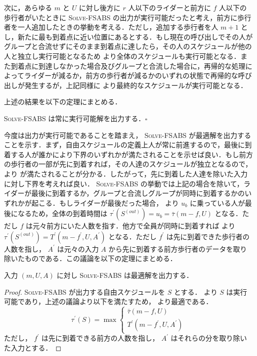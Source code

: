 次に，あらゆる $m$ と $U$ に対し後方に $r$ 人以下のライダーと前方に $f$ 人以下の歩行者がいたときに \textsc{Solve-FSABS} の出力が実行可能だったと考え，前方に歩行者を一人追加したときの挙動を考える．ただし，追加する歩行者を人 $m + 1$ とし，新たに最も到着点に近い位置にあるとする．もし現在の呼び出しでその人がグループと合流せずにそのまま到着点に達したら，その人のスケジュールが他の人と独立し実行可能となるため  より全体のスケジュールも実行可能となる．また到着点に到達しなかった場合及びグループと合流した場合に，再帰的な処理によってライダーが減るか，前方の歩行者が減るかのいずれの状態で再帰的な呼び出しが発生するが，上記同様に  より最終的なスケジュールが実行可能となる．

上述の結果を以下の定理にまとめる．

\begin{theorem}\label{theorem:solve-fsabs-is-feasible}
  \textsc{Solve-FSABS} は常に実行可能解を出力する．\hfill $\square$
\end{theorem}


今度は出力が実行可能であることを踏まえ， \textsc{Solve-FSABS} が最適解を出力することを示す．まず，自由スケジュールの定義上人が常に前進するので，最後に到着する人が誰かにより下界のいずれかが満たされることを示せば良い．もし前方の歩行者の一部が先に到着すれば，その人達のスケジュールが独立となるので，  より  が満たされることが分かる．したがって，先に到着した人達を除いた入力に対し下界を考えれば良い． \textsc{Solve-FSABS} の挙動では上記の場合を除いて，ライダーが最後に到着するか，グループと合流しグループが同時に到着するかのいずれかが起こる．もしライダーが最後だった場合，  より $u_b$ に乗っている人が最後になるため，全体の到着時間は $\tau^\prime(S^{(out)}) = u_b = \bar\tau(m - f, U)$ となる．ただし $f$ は元々前方にいた人数を指す．他方で全員が同時に到着すれば  より $\tau^\prime(S^{(out)}) = T^\prime(m - f^\prime, U, A^\prime)$ となる．ただし $f^\prime$ は先に到着できた歩行者の人数を指し， $A^{\prime}$ は元々の入力 $A$ から先に到着する前方歩行者のデータを取り除いたものである．この議論を以下の定理にまとめる．

\begin{theorem}
  入力 $(m, U, A)$ に対し \textsc{Solve-FSABS} は最適解を出力する．
\end{theorem}
\begin{proof}
  \textsc{Solve-FSABS} が出力する自由スケジュールを $S$ とする．  より $S$ は実行可能であり，上述の議論より以下を満たすため，  より最適である．
  \begin{equation}
    \tau^\prime(S) = \max \begin{cases}
      \bar\tau(m - f, U) \\
      T^\prime(m - f^\prime, U, A^\prime)
    \end{cases}
  \end{equation}
  ただし， $f^\prime$ は先に到着できる前方の人数を指し， $A^\prime$ はそれらの分を取り除いた入力とする．
\end{proof}

